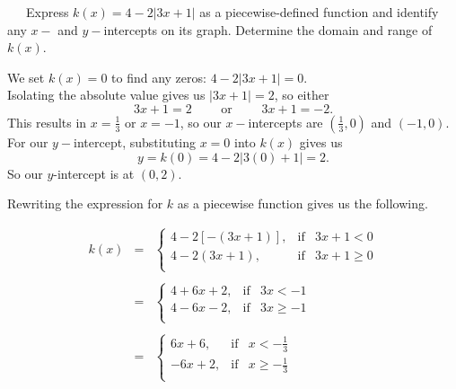\begin{example}~~~Express $k(x)= 4 - 2|3x+1|$ as a piecewise-defined function and identify any $x-$ and $y-$intercepts on its graph.  Determine the domain and range of $k(x)$.\pp

We set $k(x)=0$ to find any zeros: $4 - 2|3x+1|=0$.\\
Isolating the absolute value gives us $|3x+1|=2$, so either  $$3x+1 = 2\qquad\text{~or~}\qquad 3x+1=-2.$$
This results in $x=\frac{1}{3}$ or $x=-1$, so our $x-$intercepts are $\left(\frac{1}{3},0\right)$ and $(-1,0)$.\pp
For our $y-$intercept, substituting $x=0$ into $k(x)$ gives us $$y = k(0) = 4-2|3(0)+1| = 2.$$
So our $y$-intercept is at $(0,2)$.

Rewriting the expression for $k$ as a piecewise function gives us the following.
\begin{center}
\begin{eqnarray*}
k(x) & = & \left\{ \begin{array}{rcl} 4-2[-(3x+1)], & \mbox{if} & 3x+1 <0  \\ 4-2(3x+1), & \mbox{if} & 3x+1 \geq 0 \\ \end{array} \right.\\
&&\\
&=& \left\{ \begin{array}{rcl} 4+6x+2, & \mbox{if} & 3x < -1 \\[2pt]  4-6x-2, & \mbox{if} & 3x \geq -1 \\ \end{array} \right.\\
&&\\
&=&\left\{ \begin{array}{rcl} 6x+6, & \mbox{if} & x < -\frac{1}{3} \\[2pt]  -6x+2, & \mbox{if} & x \geq - \frac{1}{3} \\ \end{array} \right.
\end{eqnarray*}
\end{center}


\end{example}
